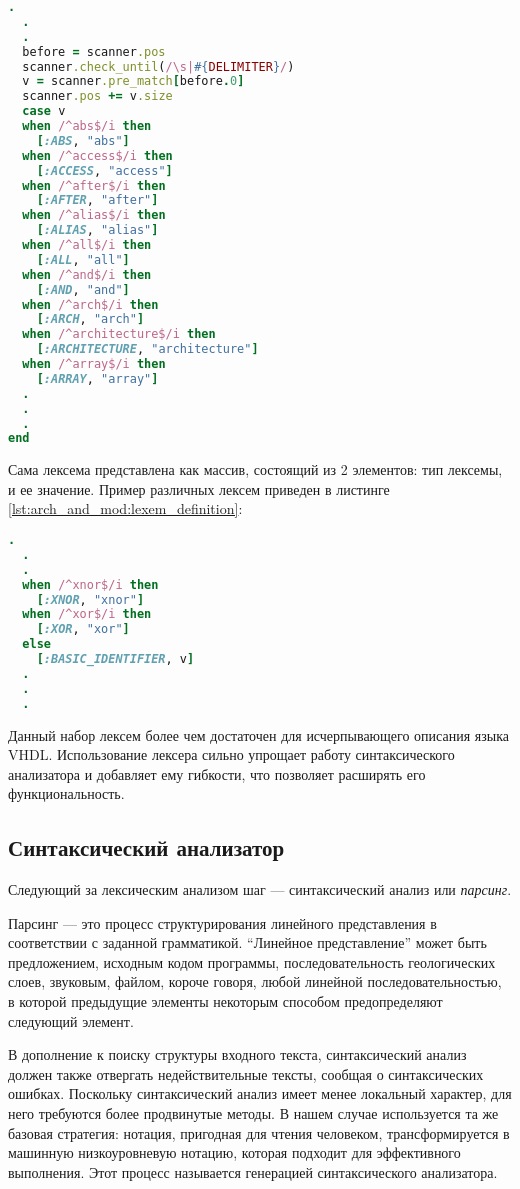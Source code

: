 \begin{lstlisting}[language=Ruby, style=rubystyle,caption={Проверка принадлежности части строки базовой конструкции языка}]
  .
  .
  .
  before = scanner.pos
  scanner.check_until(/\s|#{DELIMITER}/)
  v = scanner.pre_match[before.0]
  scanner.pos += v.size
  case v
  when /^abs$/i then
    [:ABS, "abs"]
  when /^access$/i then
    [:ACCESS, "access"]
  when /^after$/i then
    [:AFTER, "after"]
  when /^alias$/i then
    [:ALIAS, "alias"]
  when /^all$/i then
    [:ALL, "all"]
  when /^and$/i then
    [:AND, "and"]
  when /^arch$/i then
    [:ARCH, "arch"]
  when /^architecture$/i then
    [:ARCHITECTURE, "architecture"]
  when /^array$/i then
    [:ARRAY, "array"]
  .
  .
  .
end
\end{lstlisting}
Сама лексема представлена как массив, состоящий из 2 элементов: тип лексемы, и ее значение. Пример различных лексем приведен в листинге \ref{lst:arch_and_mod:lexem_definition}:
\begin{lstlisting}[language=Ruby, style=rubystyle,caption={Различные типы лексем}, label=lst:arch_and_mod:lexem_definition]
  .
  .
  .
  when /^xnor$/i then
    [:XNOR, "xnor"]
  when /^xor$/i then
    [:XOR, "xor"]
  else
    [:BASIC_IDENTIFIER, v]
  .
  .
  .
\end{lstlisting}

Данный набор лексем более чем достаточен для исчерпывающего описания языка VHDL. Использование лексера сильно упрощает работу синтаксического анализатора и добавляет ему гибкости, что позволяет расширять его функциональность.
\subsection{Синтаксический анализатор}
\label{sub:arch_and_mod:parser}
Следующий за лексическим анализом шаг --- синтаксический анализ или \textit{парсинг}.

Парсинг --- это процесс структурирования линейного представления в соответствии с заданной грамматикой. ``Линейное представление'' может быть предложением, исходным кодом программы, последовательность геологических слоев, звуковым, файлом, короче говоря, любой линейной последовательностью, в которой предыдущие элементы некоторым способом предопределяют следующий элемент.

В дополнение к поиску структуры входного текста, синтаксический анализ должен также отвергать недействительные тексты, сообщая о синтаксических ошибках. Поскольку синтаксический анализ имеет менее локальный характер, для него требуются более продвинутые методы. В нашем случае используется та же базовая стратегия: нотация, пригодная для чтения человеком, трансформируется в машинную низкоуровневую нотацию, которая подходит для эффективного выполнения. Этот процесс называется генерацией синтаксического анализатора.


